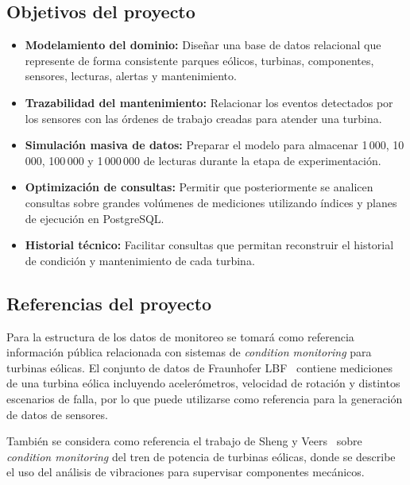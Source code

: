 \documentclass[11pt,a4paper]{article}
\begin{document}
\subsection{Objetivos del proyecto}

\begin{itemize}
    \item \textbf{Modelamiento del dominio:} Diseñar una base de datos relacional que
    represente de forma consistente parques eólicos, turbinas, componentes, sensores,
    lecturas, alertas y mantenimiento.

    \item \textbf{Trazabilidad del mantenimiento:} Relacionar los eventos detectados
    por los sensores con las órdenes de trabajo creadas para atender una turbina.

    \item \textbf{Simulación masiva de datos:} Preparar el modelo para almacenar
    1\,000, 10\,000, 100\,000 y 1\,000\,000 de lecturas durante la etapa de
    experimentación.

    \item \textbf{Optimización de consultas:} Permitir que posteriormente se analicen
    consultas sobre grandes volúmenes de mediciones utilizando índices y planes de
    ejecución en PostgreSQL.

    \item \textbf{Historial técnico:} Facilitar consultas que permitan reconstruir el
    historial de condición y mantenimiento de cada turbina.
\end{itemize}

\subsection{Referencias del proyecto}

Para la estructura de los datos de monitoreo se tomará como referencia información
pública relacionada con sistemas de \textit{condition monitoring} para turbinas
eólicas. El conjunto de datos de Fraunhofer LBF~\cite{fraunhofer} contiene mediciones
de una turbina eólica incluyendo acelerómetros, velocidad de rotación y distintos
escenarios de falla, por lo que puede utilizarse como referencia para la generación
de datos de sensores.

También se considera como referencia el trabajo de Sheng y Veers~\cite{nrel} sobre
\textit{condition monitoring} del tren de potencia de turbinas eólicas, donde se
describe el uso del análisis de vibraciones para supervisar componentes mecánicos.
\end{document}
